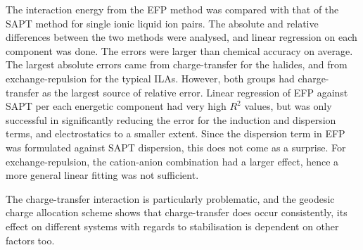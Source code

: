 
The interaction energy from the EFP method was compared with that of the SAPT method for single ionic liquid ion pairs.
The absolute and relative differences between the two methods were analysed, and linear regression on each component was done.
The errors were larger than chemical accuracy on average.
The largest absolute errors came from charge-transfer for the halides, and from exchange-repulsion for the typical ILAs. 
However, both groups had charge-transfer as the largest source of relative error.
Linear regression of EFP against SAPT per each energetic component had very high $R^2$ values, but was only successful in significantly reducing the error for the induction and dispersion terms, and electrostatics to a smaller extent.
Since the dispersion term in EFP was formulated against SAPT dispersion, this does not come as a surprise.
For exchange-repulsion, the cation-anion combination had a larger effect, hence a more general linear fitting was not sufficient.


The charge-transfer interaction is particularly problematic, and the geodesic charge allocation scheme shows that charge-transfer does occur consistently, its effect on different systems with regards to stabilisation is dependent on other factors too.


